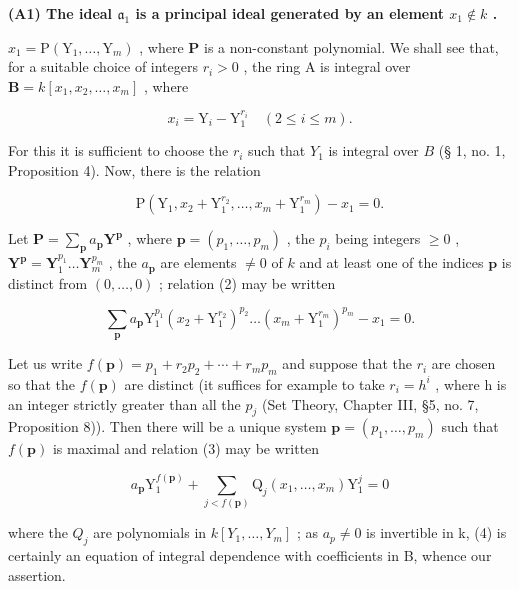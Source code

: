 \textbf{(A1) The ideal \(\mathfrak{a}_1\) is a principal ideal generated by an element \(x_1 \notin k\) .}\par

\(x_{1} = \mathrm{P}(\mathrm{Y}_{1},\ldots ,\mathrm{Y}_{m})\) , where \(\mathbf{P}\) is a non-constant polynomial. We shall see that, for a suitable choice of integers \(r_i > 0\) , the ring A is integral over \(\mathbf{B} = k[x_1,x_2,\dots ,x_m]\) , where

\[
x _ {i} = \mathrm{Y} _ {i} - \mathrm{Y} _ {1} ^ {r _ {i}} \quad (2 \leqslant i \leqslant m).\tag{1}
\]

For this it is sufficient to choose the \(r_i\) such that \(Y_1\) is integral over \(B\) (§ 1, no. 1, Proposition 4). Now, there is the relation

\[
\mathrm{P} \left(\mathrm{Y} _ {1}, x _ {2} + \mathrm{Y} _ {1} ^ {r _ {2}}, \dots , x _ {m} + \mathrm{Y} _ {1} ^ {r _ {m}}\right) - x _ {1} = 0.\tag{2}
\]

Let \(\mathbf{P} = \sum_{\mathbf{p}} a_{\mathbf{p}} \mathbf{Y}^{\mathbf{p}}\) , where \(\mathbf{p} = (p_1, \ldots, p_m)\) , the \(p_i\) being integers \(\geqslant 0\) , \(\mathbf{Y}^{\mathbf{p}} = \mathbf{Y}_1^{p_1} \ldots \mathbf{Y}_m^{p_m}\) , the \(a_{\mathbf{p}}\) are elements \(\neq 0\) of \(k\) and at least one of the indices \(\mathbf{p}\) is distinct from \((0, \ldots, 0)\) ; relation (2) may be written

\[
\sum_ {\mathbf {p}} a _ {\mathbf {p}} \mathrm{Y} _ {1} ^ {p _ {1}} (x _ {2} + \mathrm{Y} _ {1} ^ {r _ {2}}) ^ {p _ {2}} \dots (x _ {m} + \mathrm{Y} _ {1} ^ {r _ {m}}) ^ {p _ {m}} - x _ {1} = 0.\tag{3}
\]

Let us write \(f(\mathbf{p}) = p_{1} + r_{2}p_{2} + \cdots + r_{m}p_{m}\) and suppose that the \(r_{i}\) are chosen so that the \(f(\mathbf{p})\) are distinct (it suffices for example to take \(r_{i} = h^{i}\) , where h is an integer strictly greater than all the \(p_{j}\) (Set Theory, Chapter III, §5, no. 7, Proposition 8)). Then there will be a unique system \(\mathbf{p} = (p_{1}, \ldots, p_{m})\) such that \(f(\mathbf{p})\) is maximal and relation (3) may be written

\[
a _ {\mathbf {p}} \mathrm{Y} _ {1} ^ {f (\mathbf {p})} + \sum_ {j <   f (\mathbf {p})} \mathrm{Q} _ {j} (x _ {1}, \dots , x _ {m}) \mathrm{Y} _ {1} ^ {j} = 0\tag{4}
\]

where the \(Q_{j}\) are polynomials in \(k[Y_{1},\ldots,Y_{m}]\) ; as \(a_{p} \neq 0\) is invertible in k, (4) is certainly an equation of integral dependence with coefficients in B, whence our assertion.

